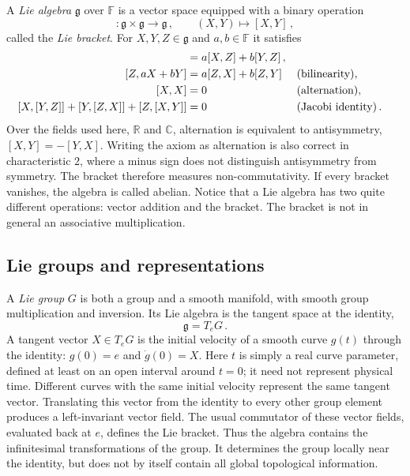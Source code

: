 A \emph{Lie algebra} $\mathfrak{g}$ over $\mathbb{F}$ is a vector space
equipped with a binary operation
\begin{equation}
    [\ ,\ ]:\mathfrak{g}\times\mathfrak{g}\longrightarrow\mathfrak{g}\,,
    \qquad (X,Y)\longmapsto[X,Y]\,,
\end{equation}
called the \emph{Lie bracket}.  For $X,Y,Z\in\mathfrak{g}$ and
$a,b\in\mathbb{F}$ it satisfies
\begin{align}
    [aX + bY,Z] & = a[X,Z] + b[Y,Z]\,,\notag\\
    [Z,aX + bY] & = a[Z,X] + b[Z,Y]
    &&\text{(bilinearity)},\label{eq:lie-bilinear}\\
    [X,X] & = 0
    &&\text{(alternation)},\label{eq:lie-alternation}\\
    [X,[Y,Z]] + [Y,[Z,X]] + [Z,[X,Y]] & = 0
    &&\text{(Jacobi identity)}\,.\label{eq:lie-jacobi}
\end{align}
Over the fields used here, $\mathbb R$ and $\mathbb C$, alternation is equivalent
to antisymmetry, $[X,Y] = -[Y,X]$.  Writing the axiom as alternation is also
correct in characteristic $2$, where a minus sign does not distinguish
antisymmetry from symmetry.
The bracket therefore measures non-commutativity.  If every bracket
vanishes, the algebra is called abelian.  Notice that a Lie algebra has two
quite different operations: vector addition and the bracket.  The bracket is
not in general an associative multiplication.


\subsection{Lie groups and representations}
A \emph{Lie group} $G$ is both a group and a smooth manifold, with smooth
group multiplication and inversion.  Its Lie algebra is the tangent space at
the identity,
\begin{equation}
    \mathfrak{g} = T_eG\,.
\end{equation}
A tangent vector $X\in T_eG$ is the initial velocity of a smooth curve
$g(t)$ through the identity: $g(0) = e$ and $\dot g(0) = X$.  Here $t$ is
simply a real curve parameter, defined at least on an open interval around
$t = 0$; it need not represent physical time.  Different curves with the same
initial velocity represent the same tangent vector.  Translating this vector
from the identity to every other group element produces a left-invariant vector
field. The usual commutator of these vector fields, evaluated back at $e$,
defines the Lie bracket.  Thus the algebra contains the infinitesimal
transformations of the group.  It determines the group locally near the
identity, but does not by itself contain all global topological information.

